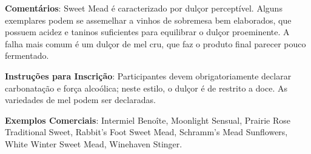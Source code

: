 \textbf{Comentários}: Sweet Mead é caracterizado por dulçor perceptível. Alguns exemplares podem se assemelhar a vinhos de sobremesa bem elaborados, que possuem acidez e taninos suficientes para equilibrar o dulçor proeminente. A falha mais comum é um dulçor de mel cru, que faz o produto final parecer pouco fermentado.

\textbf{Instruções para Inscrição}: Participantes devem obrigatoriamente declarar carbonatação e força alcoólica; neste estilo, o dulçor é de restrito a doce. As variedades de mel podem ser declaradas.

\textbf{Exemplos Comerciais}: Intermiel Benoîte, Moonlight Sensual, Prairie Rose Traditional Sweet, Rabbit's Foot Sweet Mead, Schramm's Mead Sunflowers, White Winter Sweet Mead, Winehaven Stinger.
